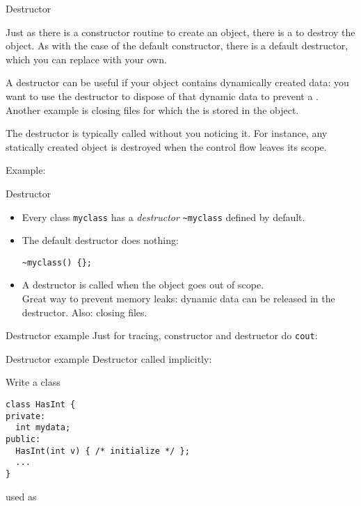  {Destructor}
\label{sec:destructor}

Just as there is a constructor routine to create an object, there is a
 to destroy the object.
As with the case of the default constructor, there is a default
destructor, which you can replace with your own.

A destructor can be useful if your object contains dynamically created
data: you want to use the destructor to dispose of that dynamic data
to prevent a . Another example is closing
files for which the  is stored in the object.

The destructor is typically called without you noticing it. For
instance, any statically created object is destroyed when the control
flow leaves its scope.

Example:
%

\begin{slide}{Destructor}
  \label{sl:class-destruct}
  \begin{itemize}
  \item Every class \lstinline{myclass} has a \emph{destructor} \lstinline{~myclass}
    defined by default.
  \item The default destructor does nothing:
\begin{lstlisting}
~myclass() {};
\end{lstlisting}
\item A destructor is called when the object goes out of scope.\\
  Great way to prevent memory leaks: dynamic data can be released
  in the destructor. Also: closing files.
\end{itemize}
\end{slide}

\begin{slide}{Destructor example}
  \label{sl:class-destruct-ex1}
  Just for tracing, constructor and destructor do \lstinline{cout}:
\end{slide}

\begin{slide}{Destructor example}
  \label{sl:class-destruct-ex2}
  Destructor called implicitly:
\end{slide}

\begin{exercise}
  \label{ex:destruct-trace}
  Write a class
\begin{lstlisting}
class HasInt {
private:
  int mydata;
public:
  HasInt(int v) { /* initialize */ };
  ...
}
\end{lstlisting}
used as
%
\end{exercise}

